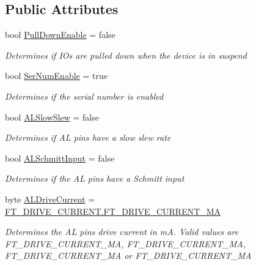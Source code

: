 \subsection*{Public Attributes}
\begin{DoxyCompactItemize}
\item 
bool \mbox{\hyperlink{class_f_t_d2_x_x___n_e_t_1_1_f_t_d_i_1_1_f_t2232_h___e_e_p_r_o_m___s_t_r_u_c_t_u_r_e_a9a26cbdc198419543de9d0f8796bf695}{Pull\+Down\+Enable}} = false
\begin{DoxyCompactList}\small\item\em Determines if I\+Os are pulled down when the device is in suspend \end{DoxyCompactList}\item 
bool \mbox{\hyperlink{class_f_t_d2_x_x___n_e_t_1_1_f_t_d_i_1_1_f_t2232_h___e_e_p_r_o_m___s_t_r_u_c_t_u_r_e_affdf9186a20d943f012b61d474ac858c}{Ser\+Num\+Enable}} = true
\begin{DoxyCompactList}\small\item\em Determines if the serial number is enabled \end{DoxyCompactList}\item 
bool \mbox{\hyperlink{class_f_t_d2_x_x___n_e_t_1_1_f_t_d_i_1_1_f_t2232_h___e_e_p_r_o_m___s_t_r_u_c_t_u_r_e_aba7ba997b4f756f995bf48e6960176e0}{A\+L\+Slow\+Slew}} = false
\begin{DoxyCompactList}\small\item\em Determines if AL pins have a slow slew rate \end{DoxyCompactList}\item 
bool \mbox{\hyperlink{class_f_t_d2_x_x___n_e_t_1_1_f_t_d_i_1_1_f_t2232_h___e_e_p_r_o_m___s_t_r_u_c_t_u_r_e_a327f28fdf9b7339fa774f21e3b8f01aa}{A\+L\+Schmitt\+Input}} = false
\begin{DoxyCompactList}\small\item\em Determines if the AL pins have a Schmitt input \end{DoxyCompactList}\item 
byte \mbox{\hyperlink{class_f_t_d2_x_x___n_e_t_1_1_f_t_d_i_1_1_f_t2232_h___e_e_p_r_o_m___s_t_r_u_c_t_u_r_e_a0349235144f67069817834df1b954188}{A\+L\+Drive\+Current}} = \mbox{\hyperlink{class_f_t_d2_x_x___n_e_t_1_1_f_t_d_i_1_1_f_t___d_r_i_v_e___c_u_r_r_e_n_t_af6b404bcc6f2eb88bbc95b183d5729ea}{F\+T\+\_\+\+D\+R\+I\+V\+E\+\_\+\+C\+U\+R\+R\+E\+N\+T.\+F\+T\+\_\+\+D\+R\+I\+V\+E\+\_\+\+C\+U\+R\+R\+E\+N\+T\+\_\+MA}}
\begin{DoxyCompactList}\small\item\em Determines the AL pins drive current in mA. Valid values are F\+T\+\_\+\+D\+R\+I\+V\+E\+\_\+\+C\+U\+R\+R\+E\+N\+T\+\_\+MA, F\+T\+\_\+\+D\+R\+I\+V\+E\+\_\+\+C\+U\+R\+R\+E\+N\+T\+\_\+MA, F\+T\+\_\+\+D\+R\+I\+V\+E\+\_\+\+C\+U\+R\+R\+E\+N\+T\+\_\+MA or F\+T\+\_\+\+D\+R\+I\+V\+E\+\_\+\+C\+U\+R\+R\+E\+N\+T\+\_\+MA \end{DoxyCompactList}\item 

\end{DoxyCompactItemize}
